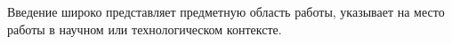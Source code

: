 
Введение широко представляет предметную область работы, указывает на место работы в научном или технологическом контексте.
